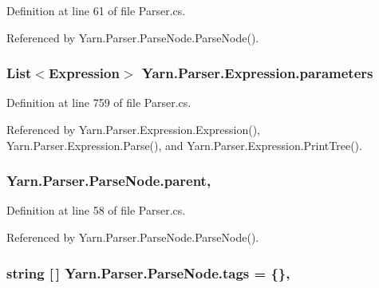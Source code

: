 Definition at line 61 of file Parser.\-cs.



Referenced by Yarn.\-Parser.\-Parse\-Node.\-Parse\-Node().

\hypertarget{a00098_a7b21380bead8ae08b2cfc6594edab32c}{
\subsubsection[{parameters}]{\setlength{\rightskip}{0pt plus 5cm}List$<${\bf Expression}$>$ Yarn.\-Parser.\-Expression.\-parameters\hspace{0.3cm}{\ttfamily [package]}}}\label{a00098_a7b21380bead8ae08b2cfc6594edab32c}


Definition at line 759 of file Parser.\-cs.



Referenced by Yarn.\-Parser.\-Expression.\-Expression(), Yarn.\-Parser.\-Expression.\-Parse(), and Yarn.\-Parser.\-Expression.\-Print\-Tree().

\hypertarget{a00142_af313a82103fcc2ff5a177dbb06b92f7b}{
\subsubsection[{parent}]{ Yarn.\-Parser.\-Parse\-Node.\-parent\hspace{0.3cm}{\ttfamily [package]}, {\ttfamily [inherited]}}}\label{a00142_af313a82103fcc2ff5a177dbb06b92f7b}


Definition at line 58 of file Parser.\-cs.



Referenced by Yarn.\-Parser.\-Parse\-Node.\-Parse\-Node().

\hypertarget{a00142_a58b3a15788fd2d4127d73619dc6d04ae}{
\subsubsection[{tags}]{\setlength{\rightskip}{0pt plus 5cm}string \mbox{[}$\,$\mbox{]} Yarn.\-Parser.\-Parse\-Node.\-tags = \{\}\hspace{0.3cm}{\ttfamily [package]}, {\ttfamily [inherited]}}}\label{a00142_a58b3a15788fd2d4127d73619dc6d04ae}


